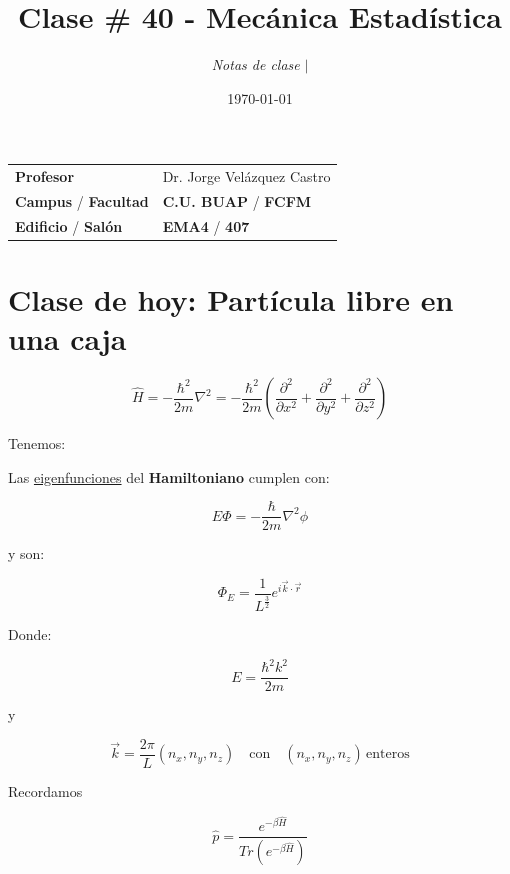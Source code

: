 \documentclass{article}
\title{Clase \# 40 - Mecánica Estadística}
\author{\emph{Notas de clase} $\boldsymbol{\mid}$}
\date{\today}
\begin{document}
\maketitle



\begin{mybox}
\noindent\begin{tabular}{@{}ll}
	{\bfseries{Profesor}} & Dr. Jorge Velázquez Castro\\
	\textcolor{prussianblue}{\bfseries{Campus}} / \textcolor{trueblue}{\bfseries{Facultad}}  & \textcolor{prussianblue}{\bfseries{C.U. BUAP}} /  \textcolor{trueblue}{\bfseries{FCFM}} \\
	\textcolor{prussianblue}{\bfseries{Edificio}} /  \textcolor{trueblue}{\bfseries{Salón}}    & 	\textcolor{prussianblue}{\bfseries{EMA4}} /  \textcolor{trueblue}{\bfseries{407}}   
\end{tabular} 
\end{mybox} \vspace{1cm}

\tableofcontents

\vspace{2cm}

\section{Clase de hoy: Partícula libre en una caja}

\[  \hat{H} = - \frac{\hbar^{2} }{2m} \nabla^{2} = - \frac{\hbar^{2}}{2m} \left( \frac{\partial^{2}}{\partial x^{2}} + \frac{\partial^{2}}{\partial y^{2}} + \frac{\partial^{2}}{\partial z^{2}}  \right) \]

Tenemos:


Las \underline{eigenfunciones} del \textbf{Hamiltoniano} cumplen con:


\[ E \Phi  = - \frac{ \hbar  }{2m} \nabla^{2}\phi \]

y son:


\[   \Phi_{E} = \frac{1}{L^{\frac{3}{2}}}e^{ i\vec{k}\cdot \vec{r} }   \]


Donde:


\[  E = \frac{\hbar^{2} k^{2} }{2m}  \]


y


\[  \vec{k} = \frac{2\pi}{ L }(n_{x},n_{y},n_{z}) \quad \text{con} \quad (n_{x},n_{y},n_{z})\, \text{enteros} \]


Recordamos 


\[ \hat{p} = \frac{ e^{-\beta \hat{H}} }{Tr(e^{-\beta \hat{H}})} \]
\end{document}
